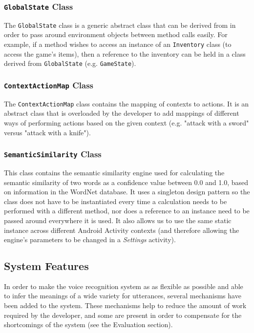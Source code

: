 \documentclass[12pt]{article}
\begin{document}
\subsubsection{\texttt{GlobalState} Class}

The \texttt{GlobalState} class is a generic abstract class that can be derived from in order to pass around environment objects between method calls easily. For example, if a method wishes to access an instance of an \texttt{Inventory} class (to access the game's items), then a reference to the inventory can be held in a class derived from \texttt{GlobalState} (e.g. \texttt{GameState}).

\subsubsection{\texttt{ContextActionMap} Class}

The \texttt{ContextActionMap} class contains the mapping of contexts to actions. It is an abstract class that is overloaded by the developer to add mappings of different ways of performing actions based on the given context (e.g. "attack with a sword" versus "attack with a knife").

\subsubsection{\texttt{SemanticSimilarity} Class}

This class contains the semantic similarity engine used for calculating the semantic similarity of two words as a confidence value between 0.0 and 1.0, based on information in the WordNet database. It uses a singleton design pattern so the class does not have to be instantiated every time a calculation needs to be performed with a different method, nor does a reference to an instance need to be passed around everywhere it is used. It also allows us to use the same static instance across different Android Activity contexts (and therefore allowing the engine's parameters to be changed in a \textit{Settings} activity).

\subsection{System Features}

In order to make the voice recognition system as as flexible as possible and able to infer the meanings of a wide variety for utterances, several mechanisms have been added to the system. These mechanisms help to reduce the amount of work required by the developer, and some are present in order to compensate for the shortcomings of the system (see the Evaluation section).
\end{document}
